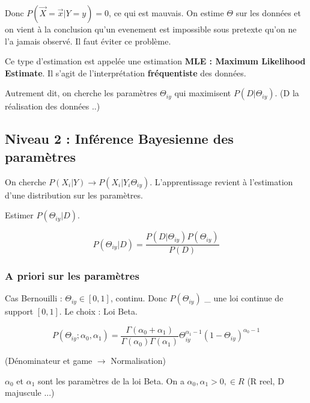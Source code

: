\documentclass{article}
\begin{document}
Donc $P(\vec{X} = \vec{x} | Y = y) = 0$, ce qui est mauvais. On estime $\Theta$ sur les données et on vient à la conclusion qu'un evenement est impossible sous pretexte qu'on ne l'a jamais observé. Il faut éviter ce problème.

Ce type d'estimation est appelée une estimation \textbf{MLE : Maximum Likelihood Estimate}. Il s'agit de l'interprétation \textbf{fréquentiste} des données.

Autrement dit, on cherche les paramètres $\Theta_{iy}$ qui maximisent $P(D | \Theta_{iy})$. (D la réalisation des données ..)

\subsection{Niveau 2 : Inférence Bayesienne des paramètres}

On cherche $P(X_i | Y) \rightarrow P(X_i | Y_i \Theta_{iy})$. L'apprentissage revient à l'estimation d'une distribution sur les paramètres.

Estimer $ P(\Theta_{iy} | D) $.

\[ P(\Theta_{iy} | D) = \frac{P(D | \Theta_{iy})P(\Theta_{iy})}{P(D)} \]

\subsubsection{A priori sur les paramètres}

Cas Bernouilli : $\Theta_{iy} \in [0, 1]$, continu. Donc $P(\Theta_{iy})$ \_ une loi continue de support $[0, 1]$.
Le choix : Loi Beta.

\[ P(\Theta_{iy}; \alpha_0, \alpha_1) = \frac{\Gamma (\alpha_0 + \alpha_1)}{\Gamma (\alpha_0) \Gamma (\alpha_1)} \Theta_{iy}^{\alpha_1 - 1} (1 - \Theta_{iy})^{\alpha_0 - 1} \]

(Dénominateur et game $\rightarrow$ Normalisation)

$\alpha_0$ et $\alpha_1$ sont les paramètres de la loi Beta. On a $\alpha_0, \alpha_1 > 0, \in R$ (R reel, D majuscule ...)
\end{document}
